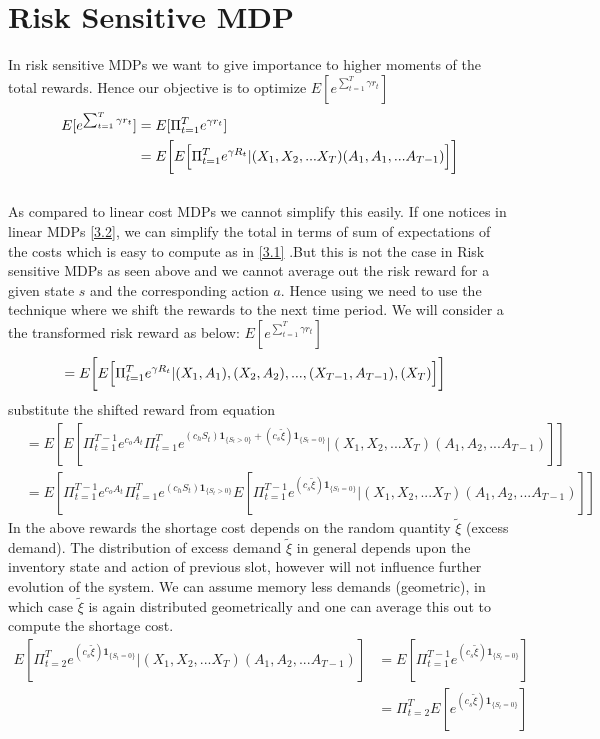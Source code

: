 \documentclass[11pt,a4paper,oneside]{report}
\begin{document}
\section{Risk Sensitive MDP}
In risk sensitive MDPs we want to give importance to higher moments of the total rewards. Hence our objective is to optimize $E[e^{\sum_{t=1}^T \gamma r_t}]$
\begin{align*}
E[e^{\sum_{t=1}^T \gamma r_t}]&=E[\Pi_{t=1}^Te^{ \gamma r_t}]\\
&=E \bigg{[}E\Big[\Pi_{t=1}^{T}e^{\gamma R_t}|(X_1,X_2,...X_T)(A_1,A_1,...A_{T-1})\Big]\bigg]
\end{align*}
\\ As compared to linear cost MDPs we cannot simplify this easily. If one notices in linear MDPs \ref{3.2}, we can simplify the total in terms of sum of expectations of the costs which is easy to compute as in \ref{3.1} .But this is not the case in Risk sensitive MDPs as seen above and we cannot average out the risk reward for a given state $s$ and the corresponding action $a$.  Hence using we need to use the technique where we shift the rewards to the next time period. We will consider a the transformed risk reward as below:
$E[e^{\sum_{t=1}^T \gamma r_t}]$
\begin{align*}
&=E \bigg{[}E\Big[\Pi_{t=1}^{T}e^{\gamma R_t}|{(X_1,A_1),(X_2,A_2),...,(X_{T-1},A_{T-1}),(X_T)}\Big]\bigg]
\end{align*}
substitute the shifted reward from equation
\begin{align*}
&=E[E[\Pi_{t=1}^{T-1} e^{c_o A_t}\Pi_{t=1}^{T}e^{(c_h S_t)\mathbf{1}_{\lbrace S_t>0\rbrace}+(c_s \tilde{\xi})\mathbf{1}_{\lbrace S_t=0\rbrace}}|(X_1,X_2,...X_T)(A_1,A_2,...A_{T-1})]]\\
&=E[\Pi_{t=1}^{T-1} e^{c_o A_t}\Pi_{t=1}^{T}e^{(c_h S_t)\mathbf{1}_{\lbrace S_t>0\rbrace}}E[\Pi_{t=1}^{T-1}e^{(c_s \tilde{\xi})\mathbf{1}_{\lbrace S_t=0\rbrace}}|(X_1,X_2,...X_T)(A_1,A_2,...A_{T-1})]]
\end{align*}
In the above rewards the shortage cost depends on the random quantity $\tilde\xi$ (excess demand). The distribution of excess demand $\tilde\xi$ in general depends upon the inventory state and action of previous slot, however will not influence further evolution of the system.  We can assume memory less demands (geometric), in which case $\tilde\xi$ is again distributed geometrically and one can average this out to compute the shortage cost.
\begin{align*}
E[\Pi_{t=2}^{T}e^{(c_s \tilde{\xi})\mathbf{1}_{\lbrace S_t=0\rbrace}}|(X_1,X_2,...X_T)(A_1,A_2,...A_{T-1})]&=E[\Pi_{t=1}^{T-1}e^{(c_s \tilde{\xi})\mathbf{1}_{\lbrace S_t=0\rbrace}}]\\
&=\Pi_{t=2}^{T}E[e^{(c_s \tilde{\xi})\mathbf{1}_{\lbrace S_t=0\rbrace}}]
\end{align*}
\end{document}
